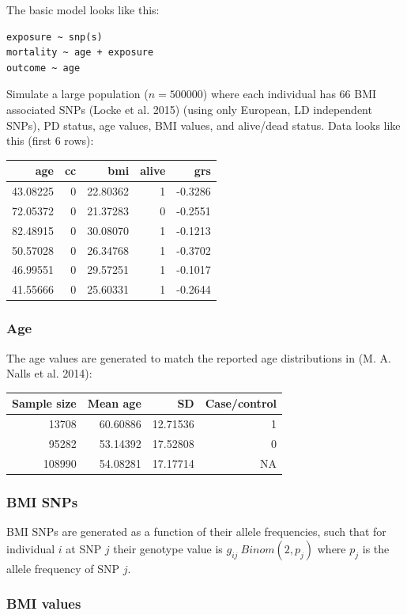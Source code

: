 \documentclass[]{article}
\begin{document}
The basic model looks like this:

\begin{verbatim}
exposure ~ snp(s)
mortality ~ age + exposure
outcome ~ age
\end{verbatim}

Simulate a large population (\(n=500000\)) where each individual has 66
BMI associated SNPs (Locke et al. 2015) (using only European, LD
independent SNPs), PD status, age values, BMI values, and alive/dead
status. Data looks like this (first 6 rows):

\begin{longtable}[c]{@{}rrrrr@{}}
\toprule
age & cc & bmi & alive & grs\tabularnewline
\midrule
\endhead
43.08225 & 0 & 22.80362 & 1 & -0.3286\tabularnewline
72.05372 & 0 & 21.37283 & 0 & -0.2551\tabularnewline
82.48915 & 0 & 30.08070 & 1 & -0.1213\tabularnewline
50.57028 & 0 & 26.34768 & 1 & -0.3702\tabularnewline
46.99551 & 0 & 29.57251 & 1 & -0.1017\tabularnewline
41.55666 & 0 & 25.60331 & 1 & -0.2644\tabularnewline
\bottomrule
\end{longtable}

\subsubsection{Age}\label{age}

The age values are generated to match the reported age distributions in
(M. A. Nalls et al. 2014):

\begin{longtable}[c]{@{}rrrr@{}}
\toprule
Sample size & Mean age & SD & Case/control\tabularnewline
\midrule
\endhead
13708 & 60.60886 & 12.71536 & 1\tabularnewline
95282 & 53.14392 & 17.52808 & 0\tabularnewline
108990 & 54.08281 & 17.17714 & NA\tabularnewline
\bottomrule
\end{longtable}

\subsubsection{BMI SNPs}\label{bmi-snps}

BMI SNPs are generated as a function of their allele frequencies, such
that for individual \(i\) at SNP \(j\) their genotype value is
\(g_{ij} ~ Binom(2, p_{j})\) where \(p_{j}\) is the allele frequency of
SNP \(j\).

\subsubsection{BMI values}\label{bmi-values}
\end{document}
